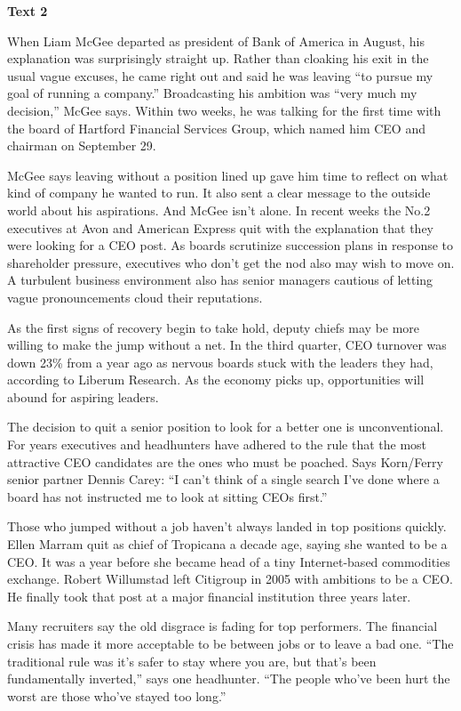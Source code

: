 \begin{center}\textbf{Text 2}\end{center}

When Liam McGee departed as president of Bank of America in August, his explanation was surprisingly straight up. Rather than cloaking his exit in the usual vague excuses, he came right out and said he was leaving ``to pursue my goal of running a company.'' Broadcasting his ambition was ``very much my decision,'' McGee says. Within two weeks, he was talking for the first time with the board of Hartford Financial Services Group, which named him CEO and chairman on September 29.

McGee says leaving without a position lined up gave him time to reflect on what kind of company he wanted to run. It also sent a clear message to the outside world about his aspirations. And McGee isn't alone. In recent weeks the No.2 executives at Avon and American Express quit with the explanation that they were looking for a CEO post. As boards scrutinize succession plans in response to shareholder pressure, executives who don't get the nod also may wish to move on. A turbulent business environment also has senior managers cautious of letting vague pronouncements cloud their reputations. 

As the first signs of recovery begin to take hold, deputy chiefs may be more willing to make the jump without a net. In the third quarter, CEO turnover was down 23\% from a year ago as nervous boards stuck with the leaders they had, according to Liberum Research. As the economy picks up, opportunities will abound for aspiring leaders.

The decision to quit a senior position to look for a better one is unconventional. For years executives and headhunters have adhered to the rule that the most attractive CEO candidates are the ones who must be poached. Says Korn/Ferry senior partner Dennis Carey: ``I can't think of a single search I've done where a board has not instructed me to look at sitting CEOs first.''

Those who jumped without a job haven't always landed in top positions quickly. Ellen Marram quit as chief of Tropicana a decade age, saying she wanted to be a CEO. It was a year before she became head of a tiny Internet-based commodities exchange. Robert Willumstad left Citigroup in 2005 with ambitions to be a CEO. He finally took that post at a major financial institution three years later.

Many recruiters say the old disgrace is fading for top performers. The financial crisis has made it more acceptable to be between jobs or to leave a bad one. ``The traditional rule was it's safer to stay where you are, but that's been fundamentally inverted,'' says one headhunter. ``The people who've been hurt the worst are those who've stayed too long.''

